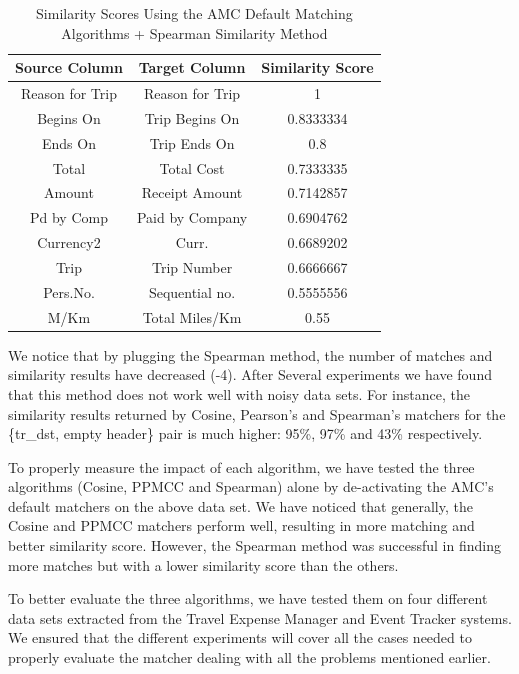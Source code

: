 \documentclass{../../Util/LaTEX/sig-alternate}
\begin{document}
\begin{table}[ht]
\centering
\begin{tabular}{|c|c|c|} \hline
\textbf{Source Column} & \textbf{Target Column} & \textbf{Similarity Score} \\ \hline
Reason for Trip & Reason for Trip & 1 \\ \hline
Begins On & Trip Begins On & 0.8333334 \\ \hline
Ends On & Trip Ends On & 0.8 \\ \hline
Total & Total Cost & 0.7333335 \\ \hline
Amount & Receipt Amount & 0.7142857 \\ \hline
Pd by Comp & Paid by Company & 0.6904762 \\ \hline
Currency2 & Curr. & 0.6689202 \\ \hline
Trip & Trip Number & 0.6666667 \\ \hline
Pers.No. & Sequential no. & 0.5555556 \\ \hline
M/Km & Total Miles/Km & 0.55 \\ \hline
\end{tabular}
\caption{ Similarity Scores Using the AMC Default Matching Algorithms + Spearman Similarity Method}
\label{tab:Similarity_Scores_Using_the_AMC_Default_Matching_Algorithms_+_Spearman_Similarity_Method}
\end{table}

We notice that by plugging the Spearman method, the number of matches and similarity results have decreased (-4). After Several experiments we have found that this method does not work well with noisy data sets. For instance, the similarity results returned by Cosine, Pearson's and Spearman's matchers for the \{tr\_dst, empty header\} pair is much higher: 95\%, 97\% and 43\% respectively.

To properly measure the impact of each algorithm, we have tested the three algorithms (Cosine, PPMCC and Spearman) alone by de-activating the AMC's default matchers on the above data set. We have noticed that generally, the Cosine and PPMCC matchers perform well, resulting in more matching and better similarity score. However, the Spearman method was successful in finding more matches but with a lower similarity score than the others.

To better evaluate the three algorithms, we have tested them on four different data sets extracted from the Travel Expense Manager and Event Tracker systems. We ensured that the different experiments will cover all the cases needed to properly evaluate the matcher dealing with all the problems mentioned earlier.
\end{document}
